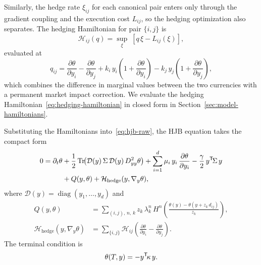 Similarly, the hedge rate $\xi_{ij}$ for each canonical pair enters only through the gradient coupling and the execution cost $L_{ij}$, so the hedging optimization also separates. The hedging Hamiltonian for pair $\{i,j\}$ is
\begin{equation}
  \label{eq:hedging-hamiltonian}
  \mathcal{H}_{ij}(q) = \sup_{\xi}\;\left[q\,\xi - L_{ij}(\xi)\right],
\end{equation}
evaluated at
\begin{equation}
  \label{eq:hedging-momentum}
  q_{ij} = \frac{\partial\theta}{\partial y_i} - \frac{\partial\theta}{\partial y_j} + k_i\,y_i\!\left(1 + \frac{\partial\theta}{\partial y_i}\right) - k_j\,y_j\!\left(1 + \frac{\partial\theta}{\partial y_j}\right),
\end{equation}
which combines the difference in marginal values between the two currencies with a permanent market impact correction. We evaluate the hedging Hamiltonian~\eqref{eq:hedging-hamiltonian} in closed form in Section~\ref{sec:model-hamiltonians}.

Substituting the Hamiltonians into~\eqref{eq:hjb-raw}, the HJB equation takes the compact form
\begin{align}
  \label{eq:hjb}
  0 = \partial_t\theta &+ \frac{1}{2}\operatorname{Tr}\!\bigl(\mathcal{D}(y)\,\Sigma\,\mathcal{D}(y)\,D^2_{yy}\theta\bigr) + \sum_{i=1}^d\mu_i\,y_i\,\frac{\partial\theta}{\partial y_i} - \frac{\gamma}{2}\,y^{\mathsf{T}}\!\Sigma\,y \notag\\
  &+ Q(y,\theta) + \mathcal{H}_{\text{hedge}}(y,\nabla_y\theta),
\end{align}
where $\mathcal{D}(y) = \operatorname{diag}(y_1, \ldots, y_d)$ and
\begin{align}
  Q(y,\theta) &= \sum_{(i,j),\,n,\,k} z_k\,\lambda^n_k\,H^n\!\left(\frac{\theta(y) - \theta(y + z_k\,d_{ij})}{z_k}\right), \label{eq:Q-total}\\[4pt]
  \mathcal{H}_{\text{hedge}}(y,\nabla_y\theta) &= \sum_{\{i,j\}} \mathcal{H}_{ij}\!\left(\frac{\partial\theta}{\partial y_i} - \frac{\partial\theta}{\partial y_j}\right). \label{eq:Hhedge-total}
\end{align}
The terminal condition is
\begin{equation}
  \label{eq:terminal}
  \theta(T, y) = -y^{\mathsf{T}}\!\kappa\,y.
\end{equation}


